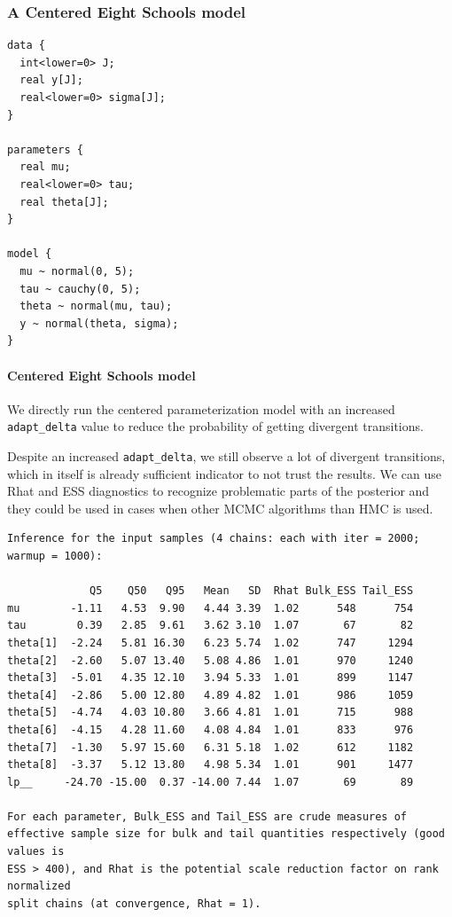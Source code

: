 \documentclass[american,]{article}
\let\oldparagraph\paragraph
\renewcommand{\paragraph}[1]{\oldparagraph{#1}\mbox{}}
\begin{document}
\hypertarget{a-centered-eight-schools-model}{%
\subsubsection{A Centered Eight Schools
model}\label{a-centered-eight-schools-model}}

\begin{verbatim}
data {
  int<lower=0> J;
  real y[J];
  real<lower=0> sigma[J];
}

parameters {
  real mu;
  real<lower=0> tau;
  real theta[J];
}

model {
  mu ~ normal(0, 5);
  tau ~ cauchy(0, 5);
  theta ~ normal(mu, tau);
  y ~ normal(theta, sigma);
}
\end{verbatim}

\hypertarget{centered-eight-schools-model}{%
\paragraph{Centered Eight Schools
model}\label{centered-eight-schools-model}}

We directly run the centered parameterization model with an increased
\texttt{adapt\_delta} value to reduce the probability of getting
divergent transitions.

Despite an increased \texttt{adapt\_delta}, we still observe a lot of
divergent transitions, which in itself is already sufficient indicator
to not trust the results. We can use Rhat and ESS diagnostics to
recognize problematic parts of the posterior and they could be used in
cases when other MCMC algorithms than HMC is used.

\begin{verbatim}
Inference for the input samples (4 chains: each with iter = 2000; warmup = 1000):

             Q5    Q50   Q95   Mean   SD  Rhat Bulk_ESS Tail_ESS
mu        -1.11   4.53  9.90   4.44 3.39  1.02      548      754
tau        0.39   2.85  9.61   3.62 3.10  1.07       67       82
theta[1]  -2.24   5.81 16.30   6.23 5.74  1.02      747     1294
theta[2]  -2.60   5.07 13.40   5.08 4.86  1.01      970     1240
theta[3]  -5.01   4.35 12.10   3.94 5.33  1.01      899     1147
theta[4]  -2.86   5.00 12.80   4.89 4.82  1.01      986     1059
theta[5]  -4.74   4.03 10.80   3.66 4.81  1.01      715      988
theta[6]  -4.15   4.28 11.60   4.08 4.84  1.01      833      976
theta[7]  -1.30   5.97 15.60   6.31 5.18  1.02      612     1182
theta[8]  -3.37   5.12 13.80   4.98 5.34  1.01      901     1477
lp__     -24.70 -15.00  0.37 -14.00 7.44  1.07       69       89

For each parameter, Bulk_ESS and Tail_ESS are crude measures of 
effective sample size for bulk and tail quantities respectively (good values is 
ESS > 400), and Rhat is the potential scale reduction factor on rank normalized
split chains (at convergence, Rhat = 1).
\end{verbatim}
\end{document}
